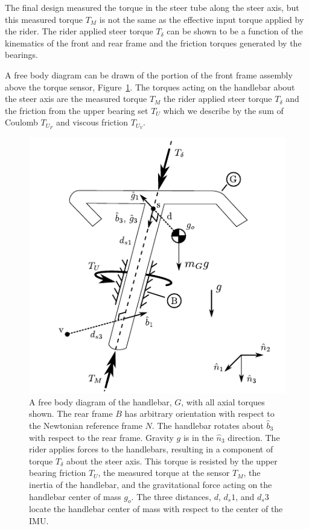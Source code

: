 \documentclass[a4paper]{article}
\begin{document}
The final design measured the torque in the steer tube along the steer axis,
but this measured torque $T_M$ is not the same as the effective input torque
applied by the rider. The rider applied steer torque $T_\delta$ can be shown to
be a function of the kinematics of the front and rear frame and the friction
torques generated by the bearings.

A free body diagram can be drawn of the portion of the front frame assembly
above the torque sensor, Figure~\ref{fig:handlebar-free-body}. The torques
acting on the handlebar about the steer axis are the measured torque $T_M$ the
rider applied steer torque $T_\delta$ and the friction from the upper bearing
set $T_U$ which we describe by the sum of Coulomb $T_{U_F}$ and viscous
friction $T_{U_V}$.

\begin{figure}
  \centering
  \includegraphics{figures/handlebar-free-body.pdf}
  \caption{A free body diagram of the handlebar, $G$, with all axial torques
    shown. The rear frame $B$ has arbitrary orientation with respect to the
    Newtonian reference frame $N$. The handlebar rotates about $\hat{b}_3$ with
    respect to the rear frame. Gravity $g$ is in the $\hat{n}_3$ direction. The
    rider applies forces to the handlebars, resulting in a component of torque
    $T_\delta$ about the steer axis. This torque is resisted by the upper
    bearing friction $T_U$, the measured torque at the sensor $T_M$, the
    inertia of the handlebar, and the gravitational force acting on the
    handlebar center of mass $g_o$. The three distances, $d$, $d_s1$, and
    $d_s3$ locate the handlebar center of mass with respect to the center of
    the IMU.}
  \label{fig:handlebar-free-body}
\end{figure}
\end{document}
